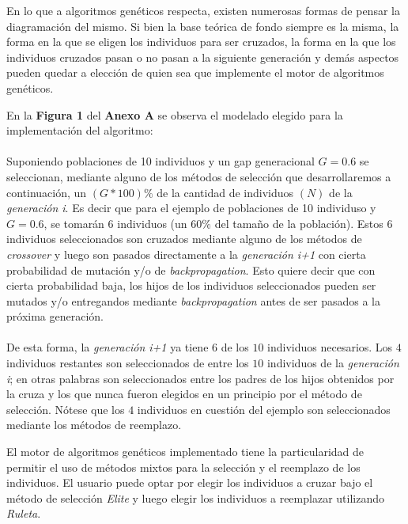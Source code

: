 \documentclass[%
    final,
    reprint,
    notitlepage,
    narroweqnarray,
    inline,
    twoside,
    invited
    ]{ieee}
\begin{document}
\par En lo que a algoritmos genéticos respecta, existen numerosas formas de pensar la diagramación del mismo. Si bien la base teórica de fondo siempre es la misma, la forma en la que se eligen los individuos para ser cruzados, la forma en la que los individuos cruzados pasan o no pasan a la siguiente generación y demás aspectos pueden quedar a elección de quien sea que implemente el motor de algoritmos genéticos.\\
\par En la \textbf{Figura 1} del \textbf {Anexo A} se observa el modelado elegido para la implementación del algoritmo: \\\\
Suponiendo poblaciones de 10 individuos y un gap generacional $G = 0.6$ se seleccionan, mediante alguno de los métodos de selección que desarrollaremos a continuación, un $(G*100)\%$ de la cantidad de individuos $(N)$ de la \textit{generación i}. Es decir que para el ejemplo de poblaciones de 10 individuso y $G = 0.6$, se tomarán $6$ individuos (un $60\%$ del tamaño de la población). Estos $6$ individuos seleccionados son cruzados mediante alguno de los métodos de \textit{crossover} y luego son pasados directamente a la \textit{generación i+1} con cierta probabilidad de mutación y/o de \textit{backpropagation}. Esto quiere decir que con cierta probabilidad baja, los hijos de los individuos seleccionados pueden ser mutados y/o entregandos mediante \textit{backpropagation} antes de ser pasados a la próxima generación.\\\\
De esta forma, la \textit{generación i+1} ya tiene $6$ de los $10$ individuos necesarios. Los $4$ individuos restantes son seleccionados de entre los $10$ individuos de la \textit{generación i}; en otras palabras son seleccionados entre los padres de los hijos obtenidos por la cruza y los que nunca fueron elegidos en un principio por el método de selección. Nótese que los $4$ individuos en cuestión del ejemplo son seleccionados mediante los métodos de reemplazo.\\

\par El motor de algoritmos genéticos implementado tiene la particularidad de permitir el uso de métodos mixtos para la selección y el reemplazo de los individuos. El usuario puede optar por elegir los individuos a cruzar bajo el método de selección \textit{Elite} y luego elegir los individuos a reemplazar utilizando \textit{Ruleta}.
\end{document}
